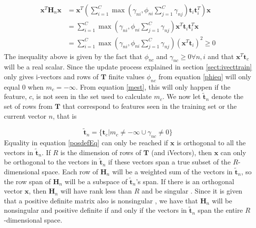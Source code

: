 \begin{align}
\mathbf{x}^T\mathbf{H}_n\mathbf{x} &= \mathbf{x}^T\left(\sum_{i=1}^C\max(\gamma_{ni}, \phi_{ni}\sum_{j=1}^{C}\gamma_{nj})\mathbf{t}_i\mathbf{t}_i^T\right)\mathbf{x} \nonumber \\
&= \sum_{i=1}^C\max(\gamma_{ni}, \phi_{ni}\sum_{j=1}^{C}\gamma_{nj})\mathbf{x}^T\mathbf{t}_i\mathbf{t}_i^T\mathbf{x} \label{posdefEq}\\
&= \sum_{i=1}^C\max(\gamma_{ni}, \phi_{ni}\sum_{j=1}^{C}\gamma_{nj})(\mathbf{x}^T\mathbf{t}_i)^2 \geq 0 \nonumber
\end{align}
The inequality above is given by the fact that $\phi_{nc}$ and $\gamma_{nc} \geq 0 \forall n, i$ and that $\mathbf{x}^T\mathbf{t}_c$ will be a real scalar. Since the update process explained in section \ref{sect:ivecttrain} only gives i-vectors and rows of $\mathbf{T}$ finite values $\phi_{nc}$ from equation \ref{phieq} will only equal 0 when $m_c = -\infty$. From equation \ref{mest}, this will only happen if the feature, $c$, is not seen in the set used to calculate $m_c$. We now let $\mathbf{\tilde{t}}_n$ denote the set of rows from $\mathbf{T}$ that correspond to features seen in the training set or the current vector $n$, that is

\begin{equation*}
\mathbf{\tilde{t}}_n = \{\mathbf{t}_c | m_c \neq -\infty \cup \gamma_{nc} \neq 0\}
\end{equation*}
Equality in equation \ref{posdefEq} can only be reached if $\mathbf{x}$ is orthogonal to all the vectors in $\mathbf{\tilde{t}}_n$. If $R$ is the dimension of rows of $\mathbf{T}$ (and iVectors), then $\mathbf{x}$ can only be orthogonal to the vectors in $\mathbf{\tilde{t}}_n$ if these vectors span a true subset of the $R$-dimensional space. Each row of $\mathbf{H}_n$ will be a weighted sum of the vectors in $\mathbf{\tilde{t}}_n$, so the row span of $\mathbf{H}_n$ will be a subspace of $\mathbf{\tilde{t}}_n$'s span. If there is an orthogonal vector $\mathbf{x}$, then $\mathbf{H}_n$ will have rank less than $R$ and be singular \cite[p. 54]{matte3}. Since it is given that a positive definite matrix also is nonsingular \cite[760]{cormen},  we have that $\mathbf{H}_n$ will be nonsingular and positive definite if and only if the vectors in $\mathbf{\tilde{t}}_n$ span the entire $R$-dimensional space.


